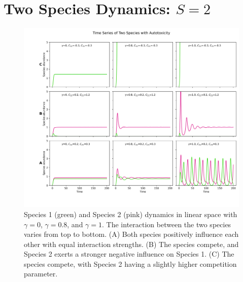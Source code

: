 \documentclass{article}
\begin{document}
\clearpage

\section{Two Species Dynamics: $S=2$}


\begin{figure}[H]
    \centering

    \includegraphics[width=\linewidth]{SingleSpecies/TwoSpecies3Cases.png}
    \caption{Species 1 (green) and Species 2 (pink) dynamics in linear space with $\gamma=0$, $\gamma=0.8$, and $\gamma=1$. The interaction between the two species varies from top to bottom. 
    (A) Both species positively influence each other with equal interaction strengths. 
    (B) The species compete, and Species 2 exerts a stronger negative influence on Species 1. 
    (C) The species compete, with Species 2 having a slightly higher competition parameter.}
    \label{fig:twospecies}
\end{figure}
\end{document}
